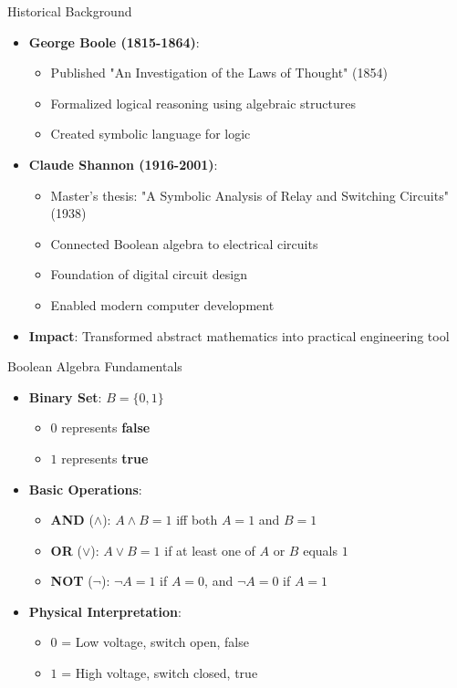 \documentclass[aspectratio=169,11pt]{beamer}
\newcommand{\concept}[1]{\textbf{\color{accentcolor}#1}}
\begin{document}
\begin{frame}{Historical Background}
\begin{itemize}
\item \concept{George Boole (1815-1864)}:
\begin{itemize}
\item Published "An Investigation of the Laws of Thought" (1854)
\item Formalized logical reasoning using algebraic structures
\item Created symbolic language for logic
\end{itemize}
\vspace{0.5cm}
\item \concept{Claude Shannon (1916-2001)}:
\begin{itemize}
\item Master's thesis: "A Symbolic Analysis of Relay and Switching Circuits" (1938)
\item Connected Boolean algebra to electrical circuits
\item Foundation of digital circuit design
\item Enabled modern computer development
\end{itemize}
\vspace{0.3cm}
\item \concept{Impact}: Transformed abstract mathematics into practical engineering tool
\end{itemize}
\end{frame}

\begin{frame}{Boolean Algebra Fundamentals}
\begin{itemize}
\item \concept{Binary Set}: $B = \{0, 1\}$
\begin{itemize}
\item $0$ represents \textbf{false}
\item $1$ represents \textbf{true}
\end{itemize}
\vspace{0.5cm}
\item \concept{Basic Operations}:
\begin{itemize}
\item \textbf{AND} ($\land$): $A \land B = 1$ iff both $A = 1$ and $B = 1$
\item \textbf{OR} ($\lor$): $A \lor B = 1$ if at least one of $A$ or $B$ equals $1$
\item \textbf{NOT} ($\neg$): $\neg A = 1$ if $A = 0$, and $\neg A = 0$ if $A = 1$
\end{itemize}
\vspace{0.3cm}
\item \concept{Physical Interpretation}:
\begin{itemize}
\item $0$ = Low voltage, switch open, false
\item $1$ = High voltage, switch closed, true
\end{itemize}
\end{itemize}
\end{frame}
\end{document}
